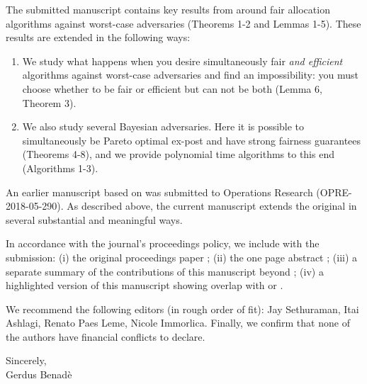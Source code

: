 The submitted manuscript contains key results from \cite{BKPP18} around fair allocation algorithms against worst-case adversaries (Theorems 1-2 and Lemmas 1-5). These results are extended in the following ways:
\begin{enumerate}[topsep=2pt, partopsep=0pt, itemsep=0pt,label=(\roman*)]
	\item We study what happens when you desire simultaneously fair \emph{and efficient} algorithms against worst-case adversaries and  find an impossibility: you must choose whether to be fair or efficient but can not be both (Lemma 6, Theorem 3). 
	\item We also study several  Bayesian adversaries. Here  it is possible to   simultaneously be Pareto optimal ex-post and have strong fairness guarantees (Theorems 4-8), and we provide polynomial time algorithms to this end (Algorithms 1-3). 
\end{enumerate}

An earlier manuscript based on \cite{BKPP18} was submitted to  Operations Research    (OPRE-2018-05-290).
  As described above,   the current manuscript extends the original in several substantial and meaningful ways. 

In accordance with the journal's proceedings policy, we include with the submission: (i) the original proceedings paper \cite{BKPP18}; (ii) the one page abstract \cite{PZ20}; (iii) a separate summary of the contributions of this manuscript beyond \cite{BKPP18}; (iv)  a highlighted version of this manuscript showing overlap with \cite{BKPP18} or \cite{PZ20}. %

We recommend the following editors (in rough order of fit): Jay Sethuraman, Itai Ashlagi, Renato Paes Leme, Nicole Immorlica. Finally, we confirm that none of the authors have  financial conflicts to declare.
\smallskip

Sincerely, \\[-3mm]

Gerdus Benad\`e 

\vspace{-4mm}




